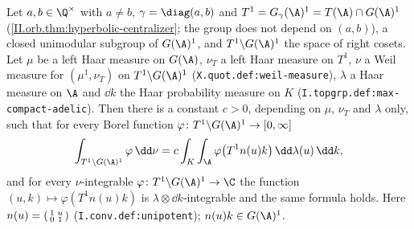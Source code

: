Let $a,b\in\Q^\times$ with $a\neq b$, $\gamma=\diag(a,b)$ and $T^1=G_\gamma(\A)^1=T(\A)\cap G(\A)^1$ (\cref{II.orb.thm:hyperbolic-centralizer}; the group does not depend on $(a,b)$), a closed unimodular subgroup of $G(\A)^1$, and $T^1\backslash G(\A)^1$ the space of
right cosets. Let $\mu$ be a left Haar measure on $G(\A)$, $\nu_T$ a left Haar measure on $T^1$, $\nu$ a Weil measure for $(\mu^1,\nu_T)$ on
$T^1\backslash G(\A)^1$ (\texttt{X.quot.def:weil-measure}), $\lambda$ a Haar measure on $\A$ and $\dd k$ the Haar probability measure on $K$
(\texttt{I.topgrp.def:max-compact-adelic}). Then there is a constant $c>0$, depending on $\mu$, $\nu_T$ and $\lambda$ only, such that for every Borel
function $\varphi\colon T^1\backslash G(\A)^1\to[0,\infty]$
\[
  \int_{T^1\backslash G(\A)^1}\varphi\,\dd\nu=c\int_K\int_\A\varphi\bigl(T^1n(u)k\bigr)\,\dd\lambda(u)\,\dd k,
\]
and for every $\nu$-integrable $\varphi\colon T^1\backslash G(\A)^1\to\C$ the function $(u,k)\mapsto\varphi(T^1n(u)k)$ is $\lambda\otimes\dd k$-integrable and the same
formula holds. Here $n(u)=\begin{psmallmatrix}1&u\\0&1\end{psmallmatrix}$ (\texttt{I.conv.def:unipotent}); $n(u)k\in G(\A)^1$.
